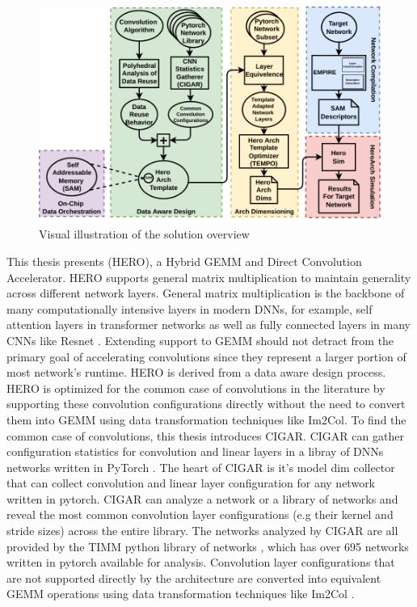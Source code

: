 \begin{figure}[!ht]
  \centering
  \includegraphics[scale=1]{fig/intro.pdf}
  \caption{Visual illustration of the solution overview}
  \label{fig:intro}
\end{figure}

This thesis presents (HERO), a Hybrid GEMM and Direct Convolution Accelerator.  
HERO supports general matrix multiplication to maintain generality across
different network layers. General matrix multiplication is the backbone of many
computationally intensive layers in modern DNNs, for example, self attention
layers in transformer networks \cite{transformer_model} as well as fully
connected layers in many CNNs like Resnet \cite{resnet}. Extending support to
GEMM should not detract from the primary goal of accelerating convolutions since
they represent a larger portion of most network's runtime.  
HERO is derived from a data aware design process. HERO is optimized for the
common case of convolutions in the literature by supporting these convolution
configurations directly without the need to convert them into GEMM using data
transformation techniques like Im2Col. To find the common case of convolutions,
this thesis introduces \ac{CIGAR}. CIGAR can gather configuration statistics for
convolution and linear layers in a libray of DNNs networks written in PyTorch
\cite{pytorch}. The heart of CIGAR is it's model dim collector that can collect
convolution and linear layer configuration for any network written in pytorch.
CIGAR can analyze a network or a library of networks and reveal the most common
convolution layer configurations (e.g their kernel and stride sizes) across the
entire library. The networks analyzed by CIGAR are all provided by the \ac{TIMM}
python library of networks \cite{timm}, which has over 695 networks written in
pytorch available for analysis. Convolution layer configurations that are not
supported directly by the architecture are converted into equivalent GEMM
operations using data transformation techniques like Im2Col
\cite{cafe_con_troll}. 

